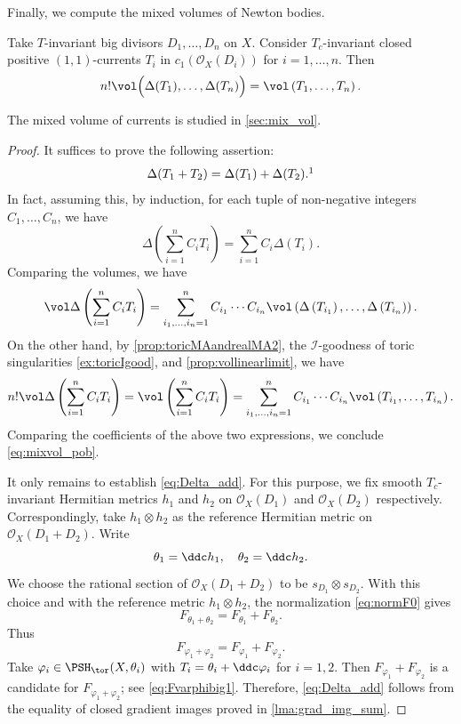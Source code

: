 Finally, we compute the mixed volumes of Newton bodies.
\begin{theorem}\label{thm:mix_vol_newbod}
Take $T$-invariant big divisors $D_1,\ldots,D_n$ on $X$. Consider $T_c$-invariant closed positive $(1,1)$-currents $T_i$ in $c_1(\mathcal{O}_X(D_i))$ for $i=1,\ldots,n$. Then
\begin{equation}\label{eq:mixvol_pob}
n! \vol \Bigl( \Delta(T_1),\ldots,\Delta(T_n) \Bigr)=\vol \left(T_1,\ldots,T_n \right).
\end{equation}
\end{theorem}
The mixed volume of currents is studied in \cref{sec:mix_vol}.
\begin{proof}
    It suffices to prove the following assertion:
    \begin{equation}\label{eq:Delta_add}
    \Delta(T_1+T_2)=\Delta(T_1)+\Delta(T_2).\footnotemark
    \end{equation}
    In fact, assuming this, by induction, for each tuple of non-negative integers $C_1,\ldots,C_n$, we have
    \[
    \Delta\left( \sum_{i=1}^n C_i T_i \right)=\sum_{i=1}^n C_i \Delta(T_i).
    \]
    Comparing the volumes, we have
    \[
    \vol \Delta\left( \sum_{i=1}^n C_i T_i \right)=\sum_{i_1,\ldots,i_n=1}^n C_{i_1}\cdots C_{i_n} \vol \left(\Delta\left(T_{i_1}\right),\ldots,\Delta\left(T_{i_n}\right)\right).
    \]
    On the other hand, by \cref{prop:toricMAandrealMA2}, the $\mathcal{I}$-goodness of toric singularities \cref{ex:toricIgood}, and \cref{prop:vollinearlimit}, we have
    \[
    n! \vol \Delta\left( \sum_{i=1}^n C_i T_i \right)=\vol \left( \sum_{i=1}^n C_i T_i \right)=\sum_{i_1,\ldots,i_n=1}^n C_{i_1}\cdots C_{i_n} \vol \left(T_{i_1},\ldots,T_{i_n}\right).
    \]
    Comparing the coefficients of the above two expressions, we conclude \eqref{eq:mixvol_pob}.

    It only remains to establish \eqref{eq:Delta_add}. For this purpose, we fix smooth $T_c$-invariant Hermitian metrics $h_1$ and $h_2$ on $\mathcal{O}_X(D_1)$ and $\mathcal{O}_X(D_2)$ respectively. Correspondingly, take $h_1\otimes h_2$ as the reference Hermitian metric on $\mathcal{O}_X(D_1+D_2)$. Write
    \[
    \theta_1=\ddc h_1,\quad \theta_2=\ddc h_2.
    \]
    We choose the rational section of $\mathcal O_X(D_1+D_2)$ to be $s_{D_1}\otimes s_{D_2}$. With this choice and with the reference metric $h_1\otimes h_2$, the normalization \eqref{eq:normF0} gives
    \[
        F_{\theta_1+\theta_2}=F_{\theta_1}+F_{\theta_2}.
    \]
    Thus
    \[
        F_{\varphi_1+\varphi_2}=F_{\varphi_1}+F_{\varphi_2}.
    \]
    Take $\varphi_i\in \PSH_{\tor}(X,\theta_i)$ with $T_i=\theta_i+\ddc \varphi_i$ for $i=1,2$. Then $F_{\varphi_1}+F_{\varphi_2}$ is a candidate for $F_{\varphi_1+\varphi_2}$; see \eqref{eq:Fvarphibig1}. Therefore, \eqref{eq:Delta_add} follows from the equality of closed gradient images proved in \cref{lma:grad_img_sum}.
\end{proof}
